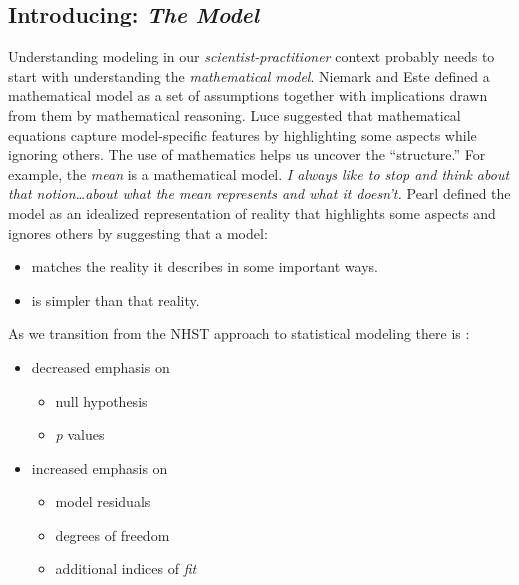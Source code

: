 \documentclass[
  11pt,
]{book}
\providecommand{\tightlist}{%
  \setlength{\itemsep}{0pt}\setlength{\parskip}{0pt}}
\begin{document}
\hypertarget{introducing-the-model}{%
\subsection{\texorpdfstring{Introducing: \emph{The Model}}{Introducing: The Model}}\label{introducing-the-model}}

Understanding modeling in our \emph{scientist-practitioner} context probably needs to start with understanding the \emph{mathematical model}. Niemark and Este \citeyearpar{niemark_stimulus_1967} defined a mathematical model as a set of assumptions together with implications drawn from them by mathematical reasoning. Luce \citep{luce_four_1995} suggested that mathematical equations capture model-specific features by highlighting some aspects while ignoring others. The use of mathematics helps us uncover the ``structure.'' For example, the \emph{mean} is a mathematical model. \emph{I always like to stop and think about that notion\ldots about what the mean represents and what it doesn't.} Pearl \citeyearpar{pearl_causality_2000} defined the model as an idealized representation of reality that highlights some aspects and ignores others by suggesting that a model:

\begin{itemize}
\tightlist
\item
  matches the reality it describes in some important ways.
\item
  is simpler than that reality.
\end{itemize}

As we transition from the NHST approach to statistical modeling there is \citep{rodgers_epistemology_2010}:

\begin{itemize}
\tightlist
\item
  decreased emphasis on

  \begin{itemize}
  \tightlist
  \item
    null hypothesis
  \item
    \emph{p} values
  \end{itemize}
\item
  increased emphasis on

  \begin{itemize}
  \tightlist
  \item
    model residuals
  \item
    degrees of freedom
  \item
    additional indices of \emph{fit}
  \end{itemize}
\end{itemize}
\end{document}
